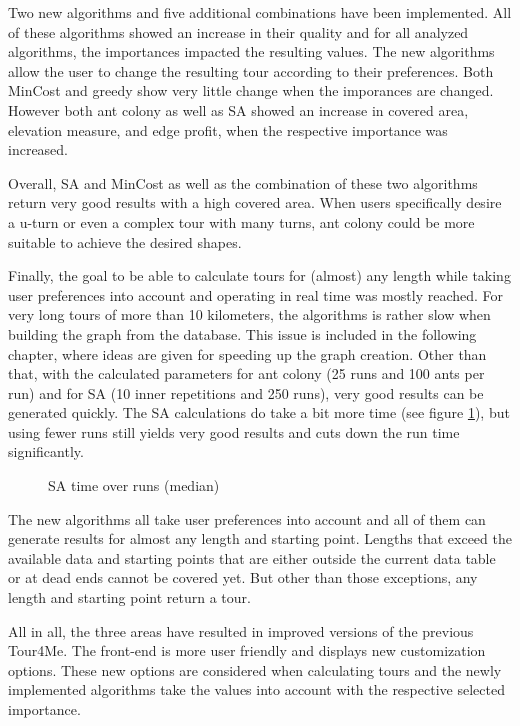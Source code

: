 Two new algorithms and five additional combinations have been implemented.
All of these algorithms showed an increase in their quality and for all analyzed algorithms, the importances impacted the resulting values.
The new algorithms allow the user to change the resulting tour according to their preferences.
Both MinCost and greedy show very little change when the imporances are changed.
However both ant colony as well as SA showed an increase in covered area, elevation measure, and edge profit, when the respective importance was increased.

Overall, SA and MinCost as well as the combination of these two algorithms return very good results with a high covered area.
When users specifically desire a u-turn or even a complex tour with many turns, ant colony could be more suitable to achieve the desired shapes.

Finally, the goal to be able to calculate tours for (almost) any length while taking user preferences into account and operating in real time was mostly reached.
For very long tours of more than 10 kilometers, the algorithms is rather slow when building the graph from the database.
This issue is included in the following chapter, where ideas are given for speeding up the graph creation.
Other than that, with the calculated parameters for ant colony (25 runs and 100 ants per run) and for SA (10 inner repetitions and 250 runs), very good results can be generated quickly.
The SA calculations do take a bit more time (see figure \ref{fig:SATimeOverRuns}), but using fewer runs still yields very good results and cuts down the run time significantly.

\begin{figure}
	\centering
	
	\caption{SA time over runs (median)}
	\label{fig:SATimeOverRuns}
\end{figure}


The new algorithms all take user preferences into account and all of them can generate results for almost any length and starting point.
Lengths that exceed the available data and starting points that are either outside the current data table or at dead ends cannot be covered yet.
But other than those exceptions, any length and starting point return a tour.

All in all, the three areas have resulted in improved versions of the previous Tour4Me.
The front-end is more user friendly and displays new customization options.
These new options are considered when calculating tours and the newly implemented algorithms take the values into account with the respective selected importance.



